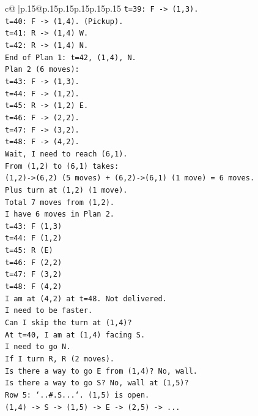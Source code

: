 \documentclass{article}
\begin{document}
{\begin{supertabular}{c@{$\;$}|p{.15\linewidth}@{}p{.15\linewidth}p{.15\linewidth}p{.15\linewidth}p{.15\linewidth}p{.15\linewidth}}
{{{\texttt{t=39: F {-}> (1,3).} \\
\texttt{t=40: F {-}> (1,4). (Pickup).} \\
\texttt{t=41: R {-}> (1,4) W.} \\
\texttt{t=42: R {-}> (1,4) N.} \\
\texttt{End of Plan 1: t=42, (1,4), N.} \\
\texttt{Plan 2 (6 moves):} \\
\texttt{t=43: F {-}> (1,3).} \\
\texttt{t=44: F {-}> (1,2).} \\
\texttt{t=45: R {-}> (1,2) E.} \\
\texttt{t=46: F {-}> (2,2).} \\
\texttt{t=47: F {-}> (3,2).} \\
\texttt{t=48: F {-}> (4,2).} \\
\texttt{Wait, I need to reach (6,1).} \\
\texttt{From (1,2) to (6,1) takes:} \\
\texttt{(1,2){-}>(6,2) (5 moves) + (6,2){-}>(6,1) (1 move) = 6 moves.} \\
\texttt{Plus turn at (1,2) (1 move).} \\
\texttt{Total 7 moves from (1,2).} \\
\texttt{I have 6 moves in Plan 2.} \\
\texttt{t=43: F (1,3)} \\
\texttt{t=44: F (1,2)} \\
\texttt{t=45: R (E)} \\
\texttt{t=46: F (2,2)} \\
\texttt{t=47: F (3,2)} \\
\texttt{t=48: F (4,2)} \\
\texttt{I am at (4,2) at t=48. Not delivered.} \\
\texttt{I need to be faster.} \\
\texttt{Can I skip the turn at (1,4)?} \\
\texttt{At t=40, I am at (1,4) facing S.} \\
\texttt{I need to go N.} \\
\texttt{If I turn R, R (2 moves).} \\
\texttt{Is there a way to go E from (1,4)? No, wall.} \\
\texttt{Is there a way to go S? No, wall at (1,5)?} \\
\texttt{Row 5: `..\#.S...`. (1,5) is open.} \\
\texttt{(1,4) {-}> S {-}> (1,5) {-}> E {-}> (2,5) {-}> ...} \\
}}}
\end{supertabular}}
\end{document}
